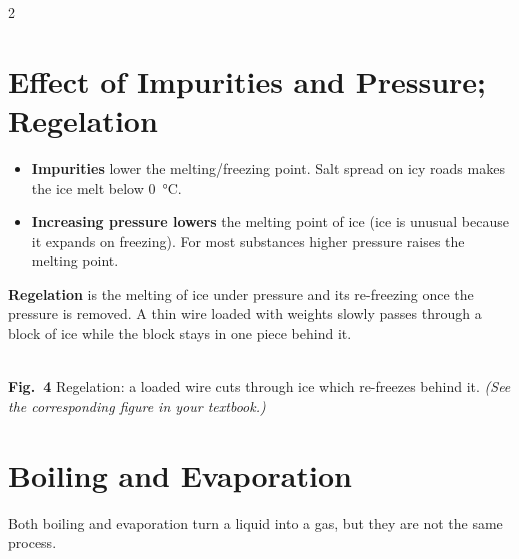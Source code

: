 \documentclass[10pt]{article}
\makeatletter
\let\theme@oldsection\section
\renewcommand{\section}{%
  \needspace{8\baselineskip}%
  \theme@oldsection}
\makeatother
\begin{document}
\begin{multicols}{2}
\section{Effect of Impurities and Pressure; Regelation}
\begin{itemize}[leftmargin=*,nosep]
  \item \textbf{Impurities} lower the melting/freezing point. Salt
        spread on icy roads makes the ice melt below
        \SI{0}{\degreeCelsius}.
  \item \textbf{Increasing pressure lowers} the melting point of ice
        (ice is unusual because it expands on freezing). For most
        substances higher pressure raises the melting point.
\end{itemize}

\begin{definition}
\textbf{Regelation} is the melting of ice under pressure and its
re-freezing once the pressure is removed. A thin wire loaded with
weights slowly passes through a block of ice while the block stays in
one piece behind it.
\end{definition}

\begin{center}
\\[2pt]
{\scriptsize\textbf{Fig.\ 4} Regelation: a loaded wire cuts through
ice which re-freezes behind it.
\textit{(See the corresponding figure in your textbook.)}}
\end{center}

\section{Boiling and Evaporation}
Both boiling and evaporation turn a liquid into a gas, but they are not
the same process.


\end{multicols}
\end{document}
